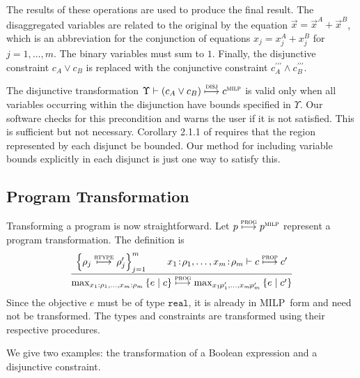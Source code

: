 \documentclass[preprint]{sigplanconf}%
\theoremstyle{remark}
\begin{document}
The results of these operations are used to produce the final result. The
disaggregated variables are related to the original by the equation $\vec
{x}=\vec{x}^{A}+\vec{x}^{B}$, which is an abbreviation for the conjunction of
equations $x_{j}=x_{j}^{A}+x_{j}^{B}$ for $j=1,\ldots,m$. The binary variables
must sum to $1$. Finally, the disjunctive constraint $c_{A}\vee c_{B}$ is
replaced with the conjunctive constraint $c_{A}^{\prime\prime\prime}\wedge
c_{B}^{\prime\prime\prime}$.

The disjunctive transformation $\Upsilon\vdash\left(  c_{A}\vee c_{B}\right)
\overset{\text{\textsc{disj}}}{\longmapsto}c^{\textsc{milp}}$ is valid only
when all variables occurring within the disjunction have bounds specified in
$\Upsilon$. Our software checks for this precondition and warns the user if it
is not satisfied. This is sufficient but not necessary. Corollary 2.1.1 of
\cite{Balas1974} requires that the region represented by each disjunct be
bounded. Our method for including variable bounds explicitly in each disjunct
is just one way to satisfy this.

\subsection{Program Transformation}

Transforming a program is now straightforward. Let $p\overset
{\text{\textsc{prog}}}{\longmapsto}p^{\textsc{milp}}$ represent a program
transformation. The definition is%
\begin{equation}
\frac{\left\{  \rho_{j}\overset{\text{\textsc{rtype}}}{\longmapsto}\rho
_{j}^{\prime}\right\}  _{j=1}^{m}\qquad x_{1}\!:\!\rho_{1},\ldots
,x_{m}\!:\!\rho_{m}\vdash c\overset{\text{\textsc{prop}}}{\longmapsto
}c^{\prime}}{\mathrm{max}_{x_{1}:\rho_{1},\ldots,x_{m}:\rho_{m}}\left\{  e\mid
c\right\}  \overset{\text{\textsc{prog}}}{\longmapsto}\mathrm{max}%
_{x_{1}\!:\!\rho_{1}^{\prime},\ldots,x_{m}\!:\!\rho_{m}^{\prime}}\left\{
e\mid c^{\prime}\right\}  } \label{prog_compiler}%
\end{equation}
Since the objective $e$ must be of type $\mathtt{real}$, it is already in
MILP\ form and need not be transformed. The types and constraints are
transformed using their respective procedures.

We give two examples: the transformation of a Boolean expression and a
disjunctive constraint.
\end{document}
